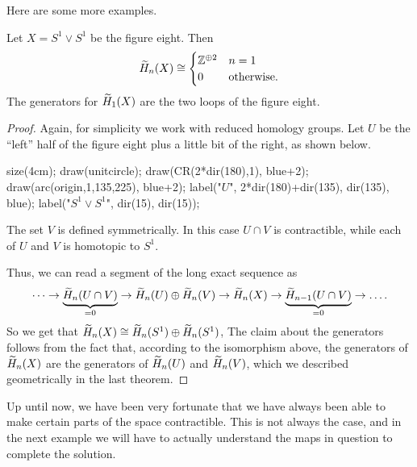 Here are some more examples.
\begin{proposition}
	Let $X = S^1 \vee S^1$ be the figure eight.
	Then
	\[
		\widetilde H_n(X) \cong
		\begin{cases}
			\mathbb Z^{\oplus 2} & n = 1 \\
			0 & \text{otherwise}.
		\end{cases}
	\]
	The generators for $\widetilde H_1(X)$ are the two loops of the figure eight.
\end{proposition}
\begin{proof}
	Again, for simplicity we work with reduced homology groups.
	Let $U$ be the ``left'' half of the figure eight plus a little bit of the right,
	as shown below.
	\begin{center}
		\begin{asy}
			size(4cm);
			draw(unitcircle);
			draw(CR(2*dir(180),1), blue+2);
			draw(arc(origin,1,135,225), blue+2);
			label("$U$", 2*dir(180)+dir(135), dir(135), blue);
			label("$S^1 \vee S^1$", dir(15), dir(15));
		\end{asy}
	\end{center}
	The set $V$ is defined symmetrically.
	In this case $U \cap V$ is contractible, while each of $U$ and $V$
	is homotopic to $S^1$.

	Thus, we can read a segment of the long exact sequence as
	\[
		\dots \to
		\underbrace{\widetilde H_n(U \cap V)}_{=0}
		\to \widetilde H_n(U) \oplus \widetilde H_n(V) \to \widetilde H_n(X) \to
		\underbrace{\widetilde H_{n-1}(U \cap V)}_{=0} \to \dots.
	\]
	So we get that $\widetilde H_n(X) \cong \widetilde H_n(S^1) \oplus \widetilde H_n(S^1)$,
	The claim about the generators follows from the fact that,
	according to the isomorphism above,
	the generators of $\widetilde H_n(X)$ are the generators of $\widetilde H_n(U)$
	and $\widetilde H_n(V)$, which we described geometrically
	in the last theorem.
\end{proof}

Up until now, we have been very fortunate that we have always been able to make
certain parts of the space contractible.
This is not always the case, and in the next example we will have to
actually understand the maps in question to complete the solution.

